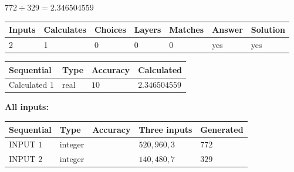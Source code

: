 \documentclass{ctexart}
\begin{document}
 

$ %
772 \div  %
329=   %
2.346504559$
 
 
\noindent{}
 
 

 
   
   
   
   
\noindent\begin{tabular}{|l|l|l|l|l|l|l|}
 \hline
Inputs & Calculates & Choices & Layers & Matches & Answer & Solution \\ \hline
 2  & 
 1  & 
 0
  & 
 0  & 
 0  & 
  yes & 
  yes 
  \\ \hline
 \end{tabular}
   
   
   
   
\noindent{}
   
   
  
  
\noindent\begin{tabular}{|l|l|l|l|}
\hline
 Sequential & Type & Accuracy & Calculated \\ 
\hline
 
 
  Calculated $  1 $ & real & $  10  $ & 
 $ 2.346504559 $ 
 \\  \hline  
 \end{tabular}
   
   
   
   
\noindent\vspace{0.1in}\hspace{-0.08in} {\textbf{\Large{All inputs: }}}
   
   
  
  
\noindent\begin{tabular}{|l|l|l|l|l|}
\hline
 Sequential & Type & Accuracy & Three inputs & Generated \\ 
\hline
 
 
  INPUT $  1 $ & integer &  & $
 520
 , 
 960
 , 
 3
 $ & $ 772 $ 
 \\  \hline  
 
 
  INPUT $  2 $ & integer &  & $
 140
 , 
 480
 , 
 7
 $ & $ 329 $ 
 \\  \hline  
 \end{tabular}
   
   
  
\vspace{0.2in}
  
\end{document}
